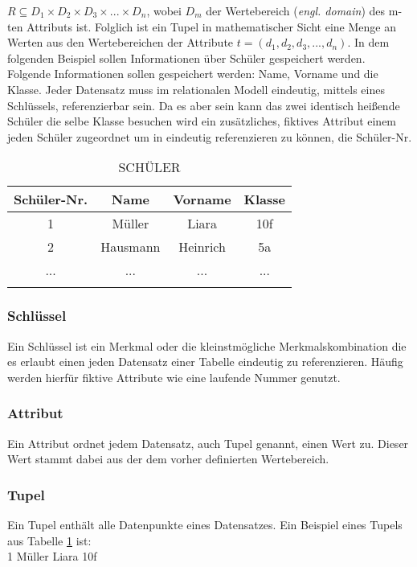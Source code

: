 \documentclass[12pt, a4paper, twoside]{article}
\begin{document}
		$ R  \subseteq D_{1 } \times D_{2 } \times D_{3 }  \times...\times D_{n}$, wobei $D_{m}$ der Wertebereich (\textit{engl. domain}) des m-ten Attributs ist.
		Folglich ist ein Tupel in mathematischer Sicht eine Menge an Werten aus den Wertebereichen der Attribute $t=(d_{1}, d_{2}, d_{3}, ...,d_{n} )$.
		\cite{Meier:SQLNoSQLDatenbanken}
		In dem folgenden Beispiel sollen Informationen über Schüler gespeichert werden. Folgende Informationen sollen gespeichert werden: Name, Vorname und die Klasse. Jeder Datensatz muss im relationalen Modell eindeutig, mittels eines Schlüssels, referenzierbar sein. Da es aber sein kann das zwei identisch heißende Schüler die selbe Klasse besuchen wird ein zusätzliches, fiktives Attribut einem jeden Schüler zugeordnet um in eindeutig referenzieren zu können, die Schüler-Nr.
		\begin{longtable}{|c|c|c|c|}
			\hline
			Schüler-Nr. & Name & Vorname & Klasse \\
			\hline
			1 & Müller & Liara & 10f \\
			\hline
			2 & Hausmann & Heinrich & 5a \\
			\hline
			... & ... & ... & ... \\
			\hline
			\caption{SCHÜLER}
			\label{table:Schüler}
		\end{longtable}
	\cite{Meier:SQLNoSQLDatenbanken}
	
	\subsubsection{Schlüssel}
	Ein Schlüssel ist ein Merkmal oder die kleinstmögliche Merkmalskombination die es erlaubt einen jeden Datensatz einer Tabelle eindeutig zu referenzieren. Häufig werden hierfür fiktive Attribute wie eine laufende Nummer genutzt.
	\subsubsection{Attribut}
	Ein Attribut ordnet jedem Datensatz, auch Tupel genannt, einen Wert zu. Dieser Wert stammt dabei aus der dem vorher definierten Wertebereich.
	\subsubsection{Tupel}
	Ein Tupel enthält alle Datenpunkte eines Datensatzes. Ein Beispiel eines Tupels aus Tabelle \ref{table:Schüler} ist:\\
	1	Müller	Liara	10f
\end{document}
